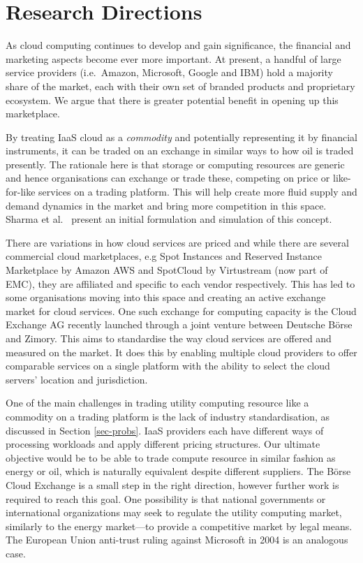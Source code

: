 \documentclass[conference,10pt]{IEEEtran}
\begin{document}

\section{Research Directions}
\label{sec-directions}

As cloud computing continues to develop and gain significance, the financial and marketing aspects become ever more important.
At present, a handful of large service providers (i.e.\ Amazon, Microsoft, Google and IBM) hold a majority share of the market, each with their own set of branded products and proprietary ecosystem. We argue that there is greater potential benefit in opening up this marketplace.

By treating IaaS cloud as a \emph{commodity} and potentially representing it by financial instruments, it can be traded on an exchange in similar ways to how oil is traded presently. The rationale here is that storage or computing resources are generic and hence organisations can exchange or trade these, competing on price or like-for-like services on a trading platform. This will help create more fluid supply and demand dynamics in the market and bring more competition in this space. Sharma et al.\ \cite{sharma12pricing} present an initial formulation and simulation of this concept.

There are variations in how cloud services are priced and while there are several commercial cloud marketplaces, e.g Spot Instances and Reserved Instance Marketplace by Amazon AWS and SpotCloud by Virtustream (now part of EMC), they are affiliated and specific to each vendor respectively. 
This has led to some organisations moving into this space and creating an active exchange market for cloud services. One such exchange for computing capacity is the Cloud Exchange AG \cite{url7} recently launched through a joint venture between Deutsche B\"{o}rse and Zimory.  This aims to standardise the way cloud services are offered and measured on the market. It does this by enabling multiple cloud providers to offer comparable services on a single platform with the ability to select the cloud servers' location and jurisdiction.

One of the main challenges in trading utility computing resource like a commodity on a trading platform is the lack of industry standardisation, as discussed in Section \ref{sec-probs}.
IaaS providers each have different ways of processing workloads and apply different pricing structures. Our ultimate objective would be to be able to trade compute resource in similar fashion as energy or oil, which is naturally equivalent despite different suppliers.
The B\"{o}rse Cloud Exchange is a small step in the right direction, however further work is required to reach this goal. One possibility is that national governments or international organizations may seek to regulate the utility computing market, similarly to the energy market---to provide a competitive market by legal means. The European Union anti-trust ruling against Microsoft in 2004 is an analogous case.
\end{document}
